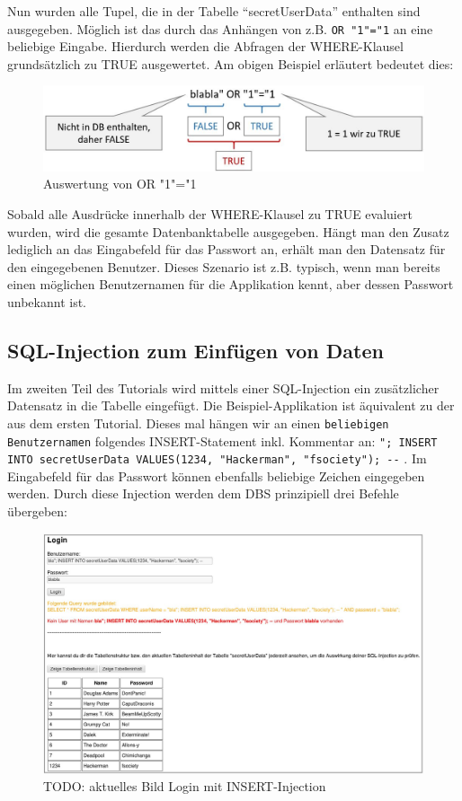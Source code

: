 Nun wurden alle Tupel, die in der Tabelle \enquote{secretUserData} enthalten sind ausgegeben. Möglich ist das durch das Anhängen von z.B. \colorbox{altgray}{\lstinline|OR "1"="1|} an eine beliebige Eingabe. Hierdurch werden die Abfragen der WHERE-Klausel grundsätzlich zu TRUE ausgewertet. Am obigen Beispiel erläutert bedeutet dies:
\begin{figure}[H]
	\centering
	\includegraphics[width=\textwidth]{images/SQL_Injection/or1is1.jpg}
	\caption{Auswertung von OR "1"="1}
	\label{fig:or1is1}
\end{figure}
Sobald alle Ausdrücke innerhalb der WHERE-Klausel zu TRUE evaluiert wurden, wird die gesamte Datenbanktabelle ausgegeben. Hängt man den Zusatz lediglich an das Eingabefeld für das Passwort an, erhält man den Datensatz für den eingegebenen Benutzer. Dieses Szenario ist z.B. typisch, wenn man bereits einen möglichen Benutzernamen für die Applikation kennt, aber dessen Passwort unbekannt ist.

\subsection{SQL-Injection zum Einfügen von Daten}
Im zweiten Teil des Tutorials wird mittels einer SQL-Injection ein zusätzlicher Datensatz in die Tabelle eingefügt. Die Beispiel-Applikation ist äquivalent zu der aus dem ersten Tutorial. Dieses mal hängen wir an einen \colorbox{altgray}{\lstinline|beliebigen Benutzernamen|} folgendes INSERT-Statement inkl. Kommentar an: \colorbox{altgray}{\lstinline|"; INSERT INTO secretUserData VALUES(1234, "Hackerman", "fsociety"); --|} . Im Eingabefeld für das Passwort können ebenfalls beliebige Zeichen eingegeben werden.
Durch diese Injection werden dem DBS prinzipiell drei Befehle übergeben:

\begin{figure}[H]
	\centering
	\includegraphics[width=\textwidth]{images/SQL_Injection/insert_injection.jpg}
	\caption{TODO: aktuelles Bild Login mit INSERT-Injection}
	\label{fig:insert_injection}
\end{figure}

